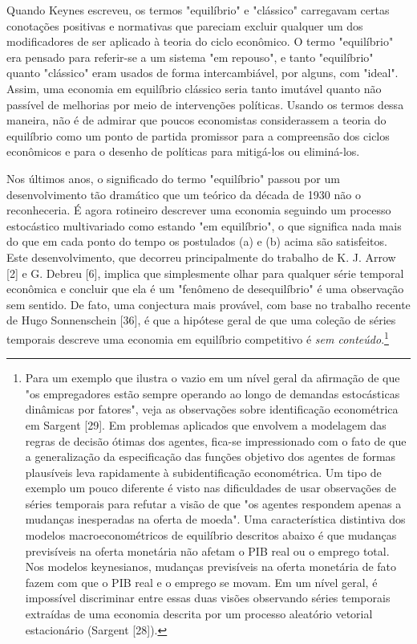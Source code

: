 \documentclass[12pt]{article}
\begin{document}
Quando Keynes escreveu, os termos "equilíbrio" e "clássico" carregavam certas conotações positivas e normativas que pareciam excluir qualquer um dos modificadores de ser aplicado à teoria do ciclo econômico. O termo "equilíbrio" era pensado para referir-se a um sistema "em repouso", e tanto "equilíbrio" quanto "clássico" eram usados de forma intercambiável, por alguns, com "ideal". Assim, uma economia em equilíbrio clássico seria tanto imutável quanto não passível de melhorias por meio de intervenções políticas. Usando os termos dessa maneira, não é de admirar que poucos economistas considerassem a teoria do equilíbrio como um ponto de partida promissor para a compreensão dos ciclos econômicos e para o desenho de políticas para mitigá-los ou eliminá-los.

Nos últimos anos, o significado do termo "equilíbrio" passou por um desenvolvimento tão dramático que um teórico da década de 1930 não o reconheceria. É agora rotineiro descrever uma economia seguindo um processo estocástico multivariado como estando "em equilíbrio", o que significa nada mais do que em cada ponto do tempo os postulados (a) e (b) acima são satisfeitos. Este desenvolvimento, que decorreu principalmente do trabalho de K. J. Arrow [2] e G. Debreu [6], implica que simplesmente olhar para qualquer série temporal econômica e concluir que ela é um "fenômeno de desequilíbrio" é uma observação sem sentido. De fato, uma conjectura mais provável, com base no trabalho recente de Hugo Sonnenschein [36], é que a hipótese geral de que uma coleção de séries temporais descreve uma economia em equilíbrio competitivo é \textit{sem conteúdo}.\footnote{Para um exemplo que ilustra o vazio em um nível geral da afirmação de que "os empregadores estão sempre operando ao longo de demandas estocásticas dinâmicas por fatores", veja as observações sobre identificação econométrica em Sargent [29]. Em problemas aplicados que envolvem a modelagem das regras de decisão ótimas dos agentes, fica-se impressionado com o fato de que a generalização da especificação das funções objetivo dos agentes de formas plausíveis leva rapidamente à subidentificação econométrica. Um tipo de exemplo um pouco diferente é visto nas dificuldades de usar observações de séries temporais para refutar a visão de que "os agentes respondem apenas a mudanças inesperadas na oferta de moeda". Uma característica distintiva dos modelos macroeconométricos de equilíbrio descritos abaixo é que mudanças previsíveis na oferta monetária não afetam o PIB real ou o emprego total. Nos modelos keynesianos, mudanças previsíveis na oferta monetária de fato fazem com que o PIB real e o emprego se movam. Em um nível geral, é impossível discriminar entre essas duas visões observando séries temporais extraídas de uma economia descrita por um processo aleatório vetorial estacionário (Sargent [28]).}
\end{document}
